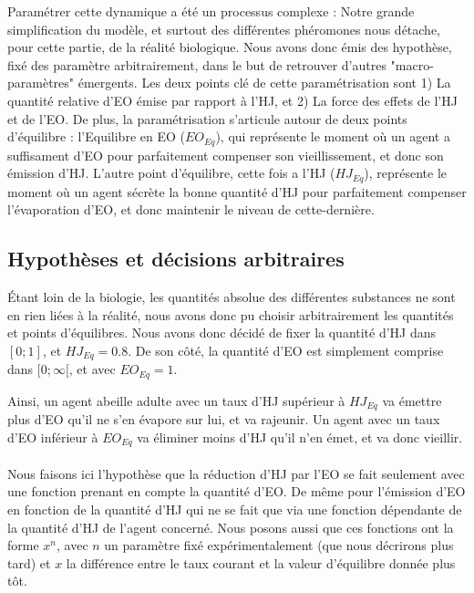 	Paramétrer cette dynamique a été un processus complexe : Notre grande simplification du modèle, et surtout des différentes phéromones nous détache, pour cette partie, de la réalité biologique. Nous avons donc émis des hypothèse, fixé des paramètre arbitrairement, dans le but de retrouver d'autres "macro-paramètres" émergents. Les deux points clé de cette paramétrisation sont 1) La quantité relative d'EO émise par rapport à l'HJ, et 2) La force des effets de l'HJ et de l'EO. De plus, la paramétrisation s'articule autour de deux points d'équilibre : l'Equilibre en EO ($EO_{Eq}$), qui représente le moment où un agent a suffisament d'EO pour parfaitement compenser son vieillissement, et donc son émission d'HJ. L'autre point d'équilibre, cette fois a l'HJ ($HJ_{Eq}$), représente le moment où un agent sécrète la bonne quantité d'HJ pour parfaitement compenser l'évaporation d'EO, et donc maintenir le niveau de cette-dernière.
	
	\subsection{Hypothèses et décisions arbitraires}
	Étant loin de la biologie, les quantités absolue des différentes substances ne sont en rien liées à la réalité, nous avons donc pu choisir arbitrairement les quantités et points d'équilibres. Nous avons donc décidé de fixer la quantité d'HJ dans $[0;1]$, et $HJ_{Eq} = 0.8$. De son côté, la quantité d'EO est simplement comprise dans $[0;\infty[$, et avec $EO_{Eq} = 1$. 
	
	Ainsi, un agent abeille adulte avec un taux d'HJ supérieur à $HJ_{Eq}$ va émettre plus d'EO qu'il ne s'en évapore sur lui, et va rajeunir. Un agent avec un taux d'EO inférieur à $EO_{Eq}$ va éliminer moins d'HJ qu'il n'en émet, et va donc vieillir.
	
	\paragraph{}
	Nous faisons ici l'hypothèse que la réduction d'HJ par l'EO se fait seulement avec une fonction prenant en compte la quantité d'EO. De même pour l'émission d'EO en fonction de la quantité d'HJ qui ne se fait que via une fonction dépendante de la quantité d'HJ de l'agent concerné. Nous posons aussi que ces fonctions ont la forme $x^n$, avec $n$ un paramètre fixé expérimentalement (que nous décrirons plus tard) et $x$ la différence entre le taux courant et la valeur d'équilibre donnée plus tôt.
	
